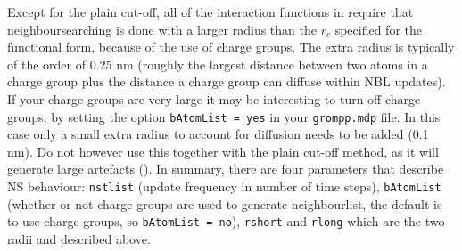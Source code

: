 Except for the plain cut-off,
all of the interaction functions in 
require that neighboursearching is done with a larger radius than the $r_c$
specified for the functional form, because of the use of charge groups.
The extra radius is typically of the order of 0.25 nm (roughly the 
largest distance between two atoms in a charge group plus the distance a 
charge group can diffuse within NBL updates).
If your charge groups are very large it may be interesting to turn off charge
groups, by setting the option 
{\tt bAtomList = yes} in your {\tt grompp.mdp} file.
In this case only a small extra radius to account for diffusion needs to be 
added (0.1 nm). Do not however use this together with the plain cut-off
method, as it will generate large artefacts ().
In summary, there are four parameters that describe NS behaviour:
{\tt nstlist} (update frequency in number of time steps),
{\tt bAtomList} (whether or not charge groups are used to generate neighbourlist, the default is to use charge groups, so {\tt bAtomList = no}),
{\tt rshort} and {\tt rlong} which are the two radii {\rs} and {\rl}
described above.

